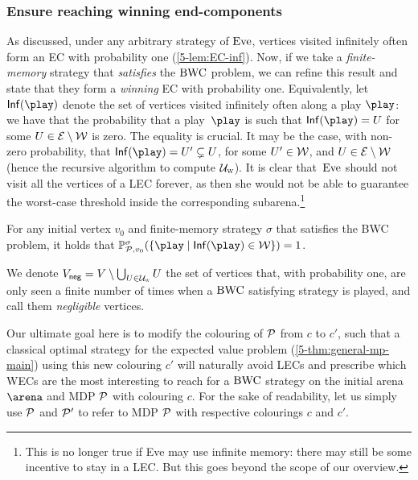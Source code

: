 \subsubsection*{Ensure reaching winning end-components} As discussed, under any arbitrary strategy of $\text{Eve}$, vertices visited infinitely often form an EC with probability one (\cref{5-lem:EC-inf}). Now, if we take a \textit{finite-memory} strategy that \textit{satisfies} the $\text{BWC}$ problem, we can refine this result and state that they form a \textit{winning} EC with probability one. Equivalently, let $\infVisited{\play}$ denote the set of vertices visited infinitely often along a play $\play$: we have that the probability that a play~$\play$ is such that $\infVisited{\play} = \ec$ for some $U \in \mathcal{E} \setminus \mathcal{W}$ is zero. The equality is crucial. It may be the case, with non-zero probability, that $\infVisited{\play} = \ec' \subsetneq \ec$, for some $U' \in \mathcal{W}$, and $U \in \mathcal{E} \setminus \mathcal{W}$ (hence the recursive algorithm to compute $\mathcal{U}_{\textsc{w}}$). It is clear that~$\text{Eve}$ should not visit all the vertices of a LEC forever, as then she would not be able to guarantee the worst-case threshold inside the corresponding subarena.\footnote{This is no longer true if Eve may use infinite memory: there may still be some incentive to stay in a LEC. But this goes beyond the scope of our overview.}

\begin{lemma}
\label{13-lem:EC-inf}
For any initial vertex $ v_0 $ and finite-memory strategy $ \sigma $ that satisfies the BWC problem, it holds that $ \probm^\sigma_{\markovProcess, v_0} ( \{\play \mid \infVisited{\play} \in \winningECs \}) = 1 $. 
\end{lemma}

We denote $V_{{\sf neg}} = V \setminus \bigcup_{U \in \mathcal{U}_{\textsc{w}}} U$ the set of vertices that, with probability one, are only seen a finite number of times when a $\text{BWC}$ satisfying strategy is played, and call them \textit{negligible} vertices.

Our ultimate goal here is to modify the colouring of ${\mathcal{P}} $ from $c$ to $c'$, such that a classical optimal strategy for the expected value problem (\cref{5-thm:general-mp-main}) using this new colouring $c'$ will naturally avoid LECs and prescribe which WECs are the most interesting to reach for a $\text{BWC}$ strategy on the initial arena $\arena$ and MDP ${\mathcal{P}} $ with colouring $c$. For the sake of readability, let us simply use ${\mathcal{P}} $ and ${\mathcal{P}} '$ to refer to MDP ${\mathcal{P}} $ with respective colourings $c$ and $c'$.

